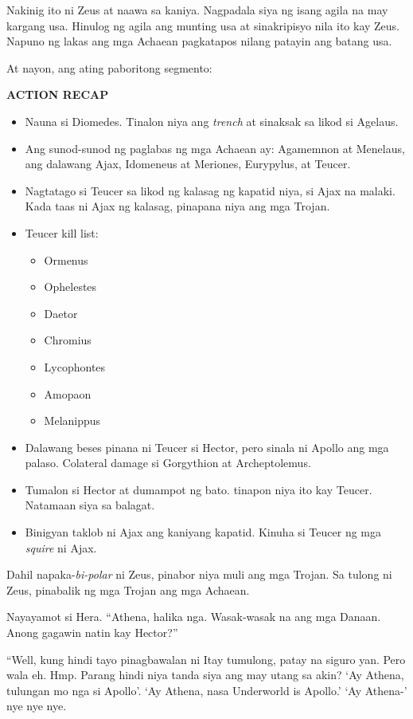\documentclass[12pt,letterpaper]{report}
\newenvironment{recap}{\begin{center}{\large\textbf{ACTION RECAP}}\begin{itemize}}{\end{itemize}\end{center}}
\begin{document}
Nakinig ito ni Zeus at naawa sa kaniya. Nagpadala siya ng isang agila na may kargang usa. Hinulog ng agila ang munting usa at sinakripisyo nila ito kay Zeus. Napuno ng lakas ang mga Achaean pagkatapos nilang patayin ang batang usa.

At nayon, ang ating paboritong segmento:

\begin{recap}
    \item Nauna si Diomedes. Tinalon niya ang \textit{trench} at sinaksak sa likod si Agelaus.
    \item Ang sunod-sunod ng paglabas ng mga Achaean ay: Agamemnon at Menelaus, ang dalawang Ajax, Idomeneus at Meriones, Eurypylus, at Teucer.
    \item Nagtatago si Teucer sa likod ng kalasag ng kapatid niya, si Ajax na malaki. Kada taas ni Ajax ng kalasag, pinapana niya ang mga Trojan.
    \item Teucer kill list:
    \begin{itemize}
        \item Ormenus
        \item Ophelestes
        \item Daetor
        \item Chromius
        \item Lycophontes
        \item Amopaon
        \item Melanippus
    \end{itemize}
    \item Dalawang beses pinana ni Teucer si Hector, pero sinala ni Apollo ang mga palaso. Colateral damage si Gorgythion at Archeptolemus.
    \item Tumalon si Hector at dumampot ng bato. tinapon niya ito kay Teucer. Natamaan siya sa balagat.
    \item Binigyan taklob ni Ajax ang kaniyang kapatid. Kinuha si Teucer ng mga \textit{squire} ni Ajax.
\end{recap}

Dahil napaka-\textit{bi-polar} ni Zeus, pinabor niya muli ang mga Trojan. Sa tulong ni Zeus, pinabalik ng mga Trojan ang mga Achaean.

Nayayamot si Hera. ``Athena, halika nga. Wasak-wasak na ang mga Danaan. Anong gagawin natin kay Hector?''

``Well, kung hindi tayo pinagbawalan ni Itay tumulong, patay na siguro yan. Pero wala eh. Hmp. Parang hindi niya tanda siya ang may utang sa akin? `Ay Athena, tulungan mo nga si Apollo'. `Ay Athena, nasa Underworld is Apollo.' `Ay Athena-' nye nye nye.
\end{document}
